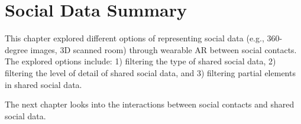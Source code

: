 \section{Social Data Summary}

This chapter explored different options of representing social data (e.g., 360-degree images, 3D scanned room) through wearable AR between social contacts. The explored options include: 1) filtering the type of shared social data, 2) filtering the level of detail of shared social data, and 3) filtering partial elements in shared social data. 

The next chapter looks into the interactions between social contacts and shared social data. 